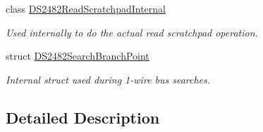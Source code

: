 \begin{DoxyCompactItemize}
class \mbox{\hyperlink{class_d_s2482_read_scratchpad_internal}{D\+S2482\+Read\+Scratchpad\+Internal}}
\begin{DoxyCompactList}\small\item\em Used internally to do the actual read scratchpad operation. \end{DoxyCompactList}\item 
struct \mbox{\hyperlink{struct_d_s2482_search_branch_point}{D\+S2482\+Search\+Branch\+Point}}
\begin{DoxyCompactList}\small\item\em Internal struct used during 1-\/wire bus searches. \end{DoxyCompactList}\end{DoxyCompactItemize}


\subsection{Detailed Description}
